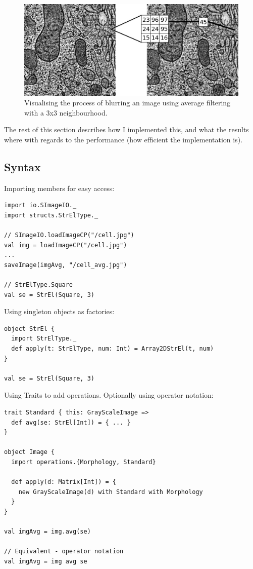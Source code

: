 \documentclass[a4paper,english]{report}
\begin{document}
\begin{figure}
  \includegraphics[width=1.0\textwidth]{images/avg_process}
  \caption{Visualising the process of blurring an image using average
    filtering with a 3x3 neighbourhood.\label{fig:exavg}}
\end{figure}

The rest of this section describes how I implemented this, and what
the results where with regards to the performance (how efficient the
implementation is).

\subsection{Syntax}

Importing members for easy access:

\begin{lstlisting}
import io.SImageIO._
import structs.StrElType._

// SImageIO.loadImageCP("/cell.jpg")
val img = loadImageCP("/cell.jpg")
...
saveImage(imgAvg, "/cell_avg.jpg")

// StrElType.Square
val se = StrEl(Square, 3)
\end{lstlisting}

Using singleton objects as factories:

\begin{lstlisting}
object StrEl {
  import StrElType._
  def apply(t: StrElType, num: Int) = Array2DStrEl(t, num)
}

val se = StrEl(Square, 3)
\end{lstlisting}

Using Traits to add operations. Optionally using operator notation:

\begin{lstlisting}
trait Standard { this: GrayScaleImage =>
  def avg(se: StrEl[Int]) = { ... }
}

object Image {
  import operations.{Morphology, Standard}

  def apply(d: Matrix[Int]) = {
    new GrayScaleImage(d) with Standard with Morphology
  }
}

val imgAvg = img.avg(se)

// Equivalent - operator notation
val imgAvg = img avg se
\end{lstlisting}
\end{document}
